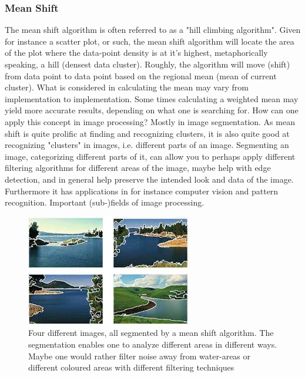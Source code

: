 \documentclass[twoside,a4paper,article]{combine}
\begin{document}
\subsubsection{Mean Shift}
The mean shift algorithm is often referred to as a "hill climbing algorithm". Given for instance a scatter plot, or such, the mean shift algorithm will locate the area of the plot where the data-point density is at it's highest, metaphorically speaking, a hill (densest data cluster). Roughly, the algorithm will move (shift) from data point to data point based on the regional mean (mean of current cluster). What is considered in calculating the mean may vary from implementation to implementation. Some times calculating a weighted mean may yield more accurate results, depending on what one is searching for.
How can one apply this concept in image processing? Mostly in image segmentation. As mean shift is quite prolific at finding and recognizing clusters, it is also quite good at recognizing "clusters" in images, i.e. different parts of an image. Segmenting an image, categorizing different parts of it, can allow you to perhaps apply different filtering algorithms for different areas of the image, maybe help with edge detection, and in general help preserve the intended look and data of the image. Furthermore it has applications in for instance computer vision and pattern recognition. Important (sub-)fields of image processing.
\begin{figure}[H]
    \centering
    \includegraphics[width=1\linewidth]{meanshift.jpeg}
    \caption{Four different images, all segmented by a mean shift algorithm. The segmentation enables one to analyze different areas in different ways. Maybe one would rather filter noise away from water-areas or different coloured areas with different filtering techniques}
    \label{fig:enter-label}
\end{figure}
\end{document}
